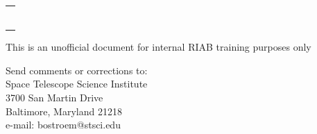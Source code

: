 \begin{titlepage}
\begin{table}[h]
\begin{tabular}{lll}
 
 \multicolumn{3}{c}{ \rule{130mm}{0.8mm}}      \\    
\end{tabular}
\end{table}%

This is an unofficial document for internal RIAB training purposes only


\vspace{120mm}

\begin{flushright}
Send comments or corrections to: \\
Space Telescope Science Institute \\
3700 San Martin Drive \\
Baltimore, Maryland 21218 \\
e-mail: bostroem@stsci.edu
 \end{flushright}
\end{titlepage}